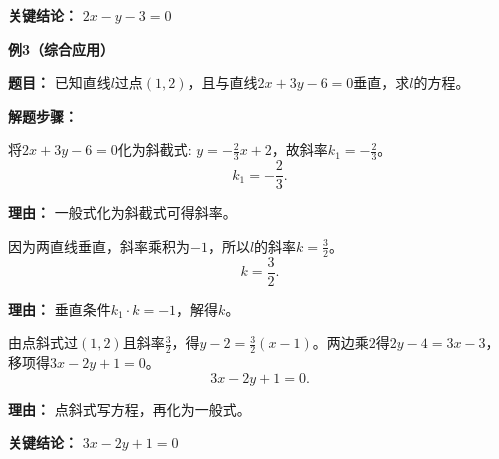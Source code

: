 \begin{examplebox}
	\textbf{\textcolor{CExample}{关键结论：}}
	\textbf{$2x-y-3=0$}

	\medskip
	\textbf{\textcolor{CExample}{例3（综合应用）}}

	\textbf{\textcolor{CExample}{题目：}}
	已知直线$l$过点$(1,2)$，且与直线$2x+3y-6=0$垂直，求$l$的方程。

	\textbf{\textcolor{CExample}{解题步骤：}}
	\begin{description}[style=nextline, leftmargin=2.8em, labelsep=0.5em, itemsep=0.45em]
		\item[\textbf{第一步（求已知直线斜率）：}] 将$2x+3y-6=0$化为斜截式: $y=-\frac{2}{3}x+2$，故斜率$k_1=-\frac{2}{3}$。
			\[
				k_1 = -\frac{2}{3}.
			\]
			\par\textbf{理由：} 一般式化为斜截式可得斜率。

		\item[\textbf{第二步（求垂直直线斜率）：}] 因为两直线垂直，斜率乘积为$-1$，所以$l$的斜率$k=\frac{3}{2}$。
			\[
				k = \frac{3}{2}.
			\]
			\par\textbf{理由：} 垂直条件$k_1\cdot k = -1$，解得$k$。

		\item[\textbf{第三步（点斜式写方程）：}] 由点斜式过$(1,2)$且斜率$\frac{3}{2}$，得$y-2 = \frac{3}{2}(x-1)$。两边乘$2$得$2y-4=3x-3$，移项得$3x-2y+1=0$。
			\[
				3x-2y+1 = 0.
			\]
			\par\textbf{理由：} 点斜式写方程，再化为一般式。
	\end{description}

	\textbf{\textcolor{CExample}{关键结论：}}
	\textbf{$3x-2y+1=0$}
\end{examplebox}

